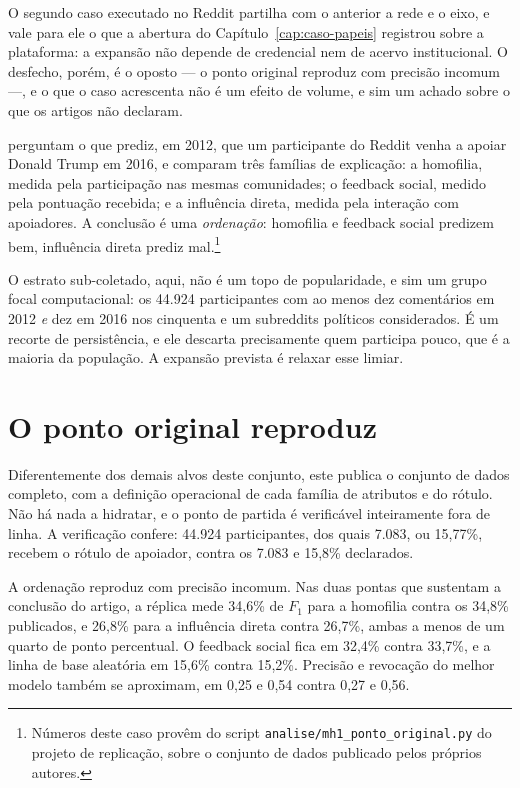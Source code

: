 O segundo caso executado no Reddit partilha com o anterior a rede e o eixo, e vale para
ele o que a abertura do Capítulo~\ref{cap:caso-papeis} registrou sobre a plataforma: a
expansão não depende de credencial nem de acervo institucional. O desfecho, porém, é o
oposto --- o ponto original reproduz com precisão incomum ---, e o que o caso acrescenta
não é um efeito de volume, e sim um achado sobre o que os artigos não declaram.

 perguntam o que prediz, em 2012, que um participante
do Reddit venha a apoiar Donald Trump em 2016, e comparam três famílias de explicação:
a homofilia, medida pela participação nas mesmas comunidades; o feedback social, medido
pela pontuação recebida; e a influência direta, medida pela interação com apoiadores.
A conclusão é uma \emph{ordenação}: homofilia e feedback social predizem bem, influência
direta prediz mal.\footnote{Números deste caso provêm do script
\texttt{analise/mh1\_ponto\_original.py} do projeto de replicação, sobre o conjunto de dados
publicado pelos próprios autores.}

O estrato sub-coletado, aqui, não é um topo de popularidade, e sim um grupo focal
computacional: os 44.924 participantes com ao menos dez comentários em 2012 \emph{e}
dez em 2016 nos cinquenta e um subreddits políticos considerados. É um recorte de
persistência, e ele descarta precisamente quem participa pouco, que é a maioria da
população. A expansão prevista é relaxar esse limiar.

\section{O ponto original reproduz}

Diferentemente dos demais alvos deste conjunto, este publica o conjunto de dados
completo, com a definição operacional de cada família de atributos e do rótulo. Não há
nada a hidratar, e o ponto de partida é verificável inteiramente fora de linha. A
verificação confere: 44.924 participantes, dos quais 7.083, ou 15,77\%, recebem o rótulo
de apoiador, contra os 7.083 e 15,8\% declarados.

A ordenação reproduz com precisão incomum. Nas duas pontas que sustentam a conclusão do
artigo, a réplica mede 34,6\% de $F_1$ para a homofilia contra os 34,8\% publicados, e
26,8\% para a influência direta contra 26,7\%, ambas a menos de um quarto de ponto
percentual. O feedback social fica em 32,4\% contra 33,7\%, e a linha de base aleatória
em 15,6\% contra 15,2\%. Precisão e revocação do melhor modelo também se aproximam, em
0,25 e 0,54 contra 0,27 e 0,56.

